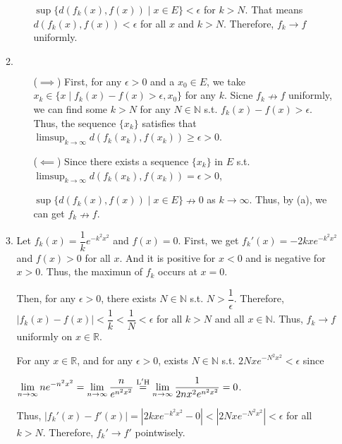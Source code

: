 \documentclass[12pt]{article}
\begin{document}
\begin{enumerate}
\begin{enumerate}
\begin{enumerate}
            $\sup \{ d(f_k(x), f(x)) \mid x \in E\} < \epsilon$ for $k > N$.
            That means $d(f_k(x), f(x)) < \epsilon$ for all $x$ and $k > N$.
            Therefore, $f_k \to f$ uniformly.
        \end{enumerate}
        \newpage

        \item $\ $\begin{enumerate}
            \item[($\implies$)] First, for any $\epsilon > 0$ and a $x_0 \in E$, we take$x_k \in \{ x \mid f_k(x) - f(x) > \epsilon, x_0\}$ for any $k$.
            Sicne $f_k \nrightarrow f$ uniformly, we can find some $k > N$ for any $N\in \mathbb{N}$ s.t. $f_k(x) - f(x) > \epsilon$.
            Thus, the sequence $\{ x_k\}$ satisfies that $\displaystyle\limsup_{k\to\infty} d(f_k(x_k), f(x_k)) \geq \epsilon > 0$.

            \item[($\impliedby$)] Since there exists a sequence $\{ x_k \}$ in $E$ s.t. $\displaystyle\limsup_{k\to\infty} d(f_k(x_k), f(x_k)) = \epsilon > 0$,

            $\sup \{ d(f_k(x), f(x)) \mid x\in E\} \nrightarrow 0$ as $k \to \infty$.
            Thus, by (a), we can get $f_k \nrightarrow f$.
        \end{enumerate}

        \item Let $f_k(x) = \dfrac{1}{k}e^{-k^2x^2}$ and $f(x) = 0$.
        First, we get $f_k'(x) = -2kxe^{-k^2x^2}$ and $f(x) > 0$ for all $x$.
        And it is positive for $x < 0$ and is negative for $x > 0$.
        Thus, the maximun of $f_k$ occurs at $x = 0$.
        
        Then, for any $\epsilon > 0$, there exists $N \in \mathbb{N}$ s.t. $N > \dfrac{1}{\epsilon}$.
        Therefore, $|f_k(x) - f(x)| < \dfrac{1}{k} < \dfrac{1}{N} < \epsilon$ for all $k > N$ and all $x\in \mathbb{N}$.
        Thus, $f_k \to f$ uniformly on $x \in \mathbb{R}$.

        For any $x \in \mathbb{R}$, and for any $\epsilon > 0$, exists $N \in \mathbb{N}$
        s.t. $2Nxe^{-N^2x^2} < \epsilon$ since 
        
        $\displaystyle\lim_{n\to\infty} ne^{-n^2x^2} = \displaystyle\lim_{n\to\infty} \dfrac{n}{e^{n^2x^2}} \overset{\rm L'H}{=} \displaystyle\lim_{n\to\infty} \dfrac{1}{2nx^2e^{n^2x^2}} = 0$.

        Thus, $|f_k'(x) - f'(x)| = |2kxe^{-k^2x^2} - 0| < |2Nxe^{-N^2x^2}| < \epsilon$ for all $k > N$.
        Therefore, $f_k' \to f'$ pointwisely.


\end{enumerate}
\end{enumerate}
\end{document}

